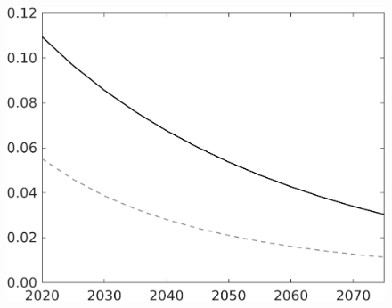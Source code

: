 \documentclass[12pt]{article}
\begin{document}
\begin{figure}[h!!]
\begin{minipage}[]{0.32\textwidth}
	\end{minipage}	
\begin{minipage}[]{0.32\textwidth}
\includegraphics[width=1\textwidth]{../../codding_model/own_basedOnFried/optimalPol_010922_revision/figures/all_13Sept22/LevTaufNoTauf_TaulCalib_Equlab_regime0_pepn_spillover0_nsk1_xgr0_knspil1_sep1_LFlimit0_emsbase0_countec0_GovRev0_etaa0.79_lgd0.png}
\end{minipage}		
\end{figure}
\end{document}

